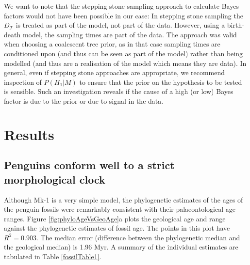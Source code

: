 \documentclass[11pt]{article}
\newcommand{\Mstrict}{{Mk-1}}
\begin{document}
We want to note that the stepping stone sampling approach \cite{Xie2011}
 to calculate Bayes factors would not have been possible in our case:  In stepping stone sampling the $D_\mathcal{T}$ is treated as part of the model, not part of the data. However, using a birth-death model, the sampling times are part of the data. The approach was valid when choosing a  coalescent tree prior, as in that case sampling times are conditioned upon (and thus can be seen as part of the model) rather than being modelled (and thus are a realisation of the model which means they are data).
In general, even if stepping stone approaches are appropriate, we recommend inspection of $P(H_1|M)$ to ensure that the prior on the hypothesis to be tested is sensible. Such an investigation reveals if the cause of a high (or low) Bayes factor is due to the prior or due to signal in the data.

\section*{Results}

\subsection*{Penguins conform well to a strict morphological clock}
Although \Mstrict{} is a very simple model, the phylogenetic estimates of the ages of the penguin fossils were remarkably consistent with their palaeontological age ranges. 
Figure \ref{fig:phyloAgeVsGeoAge}a plots the geological age and range against the phylogenetic estimates of fossil age. The points in this plot have $R^2 = 0.903$. 
The median error (difference between the phylogenetic median and the geological median) is 1.96 Myr. A summary of the individual estimates are tabulated in Table \ref{fossilTable1}.
\end{document}
